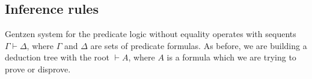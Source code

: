 

\setcounter{section}{2}
\setcounter{subsection}{2}
\setcounter{dfn}{3}

\subsection{Inference rules}
Gentzen system for the predicate logic without equality operates with sequents $\Gamma \vdash \Delta$,
where $\Gamma$ and $\Delta$ are sets of predicate formulas.
As before, we are building a deduction tree with the root $\vdash A$,
where $A$ is a formula which we are trying to prove or disprove.


